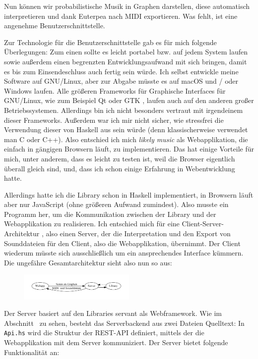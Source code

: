 \documentclass[a4paper,twocolumn]{article}
\begin{document}
Nun können wir probabilistische Musik in Graphen darstellen, diese automatisch
interpretieren und dank Euterpea nach MIDI exportieren. Was fehlt, ist eine
angenehme Benutzerschnittstelle.

Zur Technologie für die Benutzerschnittstelle gab es für mich folgende
Überlegungen: Zum einen sollte es leicht portabel bzw. auf jedem System laufen
sowie außerdem einen begrenzten Entwicklungsaufwand mit sich bringen, damit es
bis zum Einsendeschluss auch fertig sein würde. Ich selbst entwickle meine Software auf
GNU/Linux, aber zur Abgabe müsste es auf macOS und / oder Windows laufen. Alle
größeren Frameworks für Graphische Interfaces für GNU/Linux, wie zum Beispiel Qt
\cite{qt} oder GTK \cite{gtk}, laufen auch auf den anderen großer
Betriebssystemen. Allerdings bin ich nicht besonders vertraut mit irgendeinem
dieser Frameworks. Außerdem war ich mir nicht sicher, wie stressfrei die
Verwendung dieser von Haskell aus sein würde (denn klassischerweise verwendet
man C oder C++). Also entschied ich mich {\it likely music} als Webapplikation,
die einfach in gängigen Browsern läuft, zu implementieren. Das hat einige
Vorteile für mich, unter anderem, dass es leicht zu testen ist, weil die Browser
eigentlich überall gleich sind, und, dass ich schon einige Erfahrung in
Webentwicklung hatte.

Allerdings hatte ich die Library schon in Haskell implementiert, in Browsern
läuft aber nur JavaScript (ohne größeren Aufwand zumindest). Also musste
ein Programm her, um die Kommunikation zwischen der Library und der
Webapplikation zu realisieren. Ich entschied mich für eine
Client-Server-Architektur \cite{wikipedia_client_server}, also einen Server, der
die Interpretation und den Export von Sounddateien für den Client, also die
Webapplikation, übernimmt. Der Client wiederum müsste sich ausschließlich um ein
ansprechendes Interface kümmern. Die ungefähre Gesamtarchitektur sieht also nun
so aus:

\begin{figure}[h]
  \includegraphics[width=0.5\textwidth]{architektur}
\end{figure}

Der Server basiert auf den Libraries servant \cite{servant} als Webframework.
Wie im Abschnitt~ zu sehen, besteht das Serverbackend aus
zwei Dateien Quelltext: In \lstinline[basicstyle=\ttfamily]|Api.hs| wird die
Struktur der REST-API \cite{wikipedia_rest} definiert, mittels der die
Webapplikation mit dem Server kommuniziert. Der Server bietet folgende Funktionalität
an:
\end{document}
